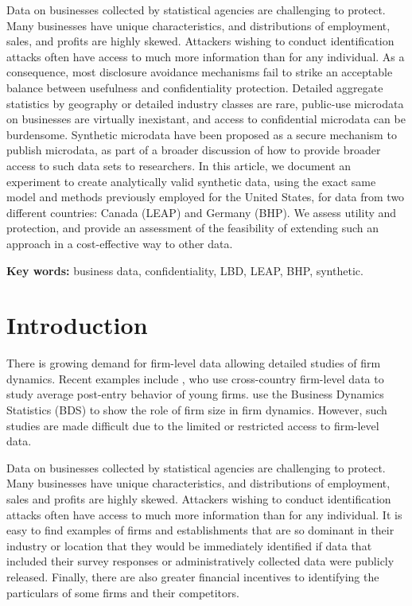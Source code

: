 \documentclass[10pt,twoside]{article}
\begin{document}
\begin{addmargin}[6mm]{6mm}
\begin{small}
\begin{singlespace}

Data on businesses collected by statistical agencies are challenging to protect. Many businesses have unique characteristics, and distributions of employment, sales, and profits are highly skewed. Attackers wishing to conduct identification attacks often have access to much more information than for any individual. As a consequence, most disclosure avoidance mechanisms  fail to strike an acceptable balance between usefulness and confidentiality protection. Detailed aggregate statistics by geography or detailed industry classes are rare, public-use microdata on businesses are virtually inexistant, and access to confidential microdata can be burdensome. 
Synthetic microdata have been proposed as a secure mechanism to publish microdata, as part of a broader discussion of how  to provide broader access to such data sets to researchers.
In this article, we document an experiment to create analytically valid synthetic data, using the exact same model and methods previously employed for the United States, for data from two different countries: Canada (\ac{LEAP}) and Germany (\ac{BHP}). We assess utility and protection, and provide an assessment of the feasibility of extending such an approach in a cost-effective way to other data.

\smallskip \noindent \textbf{Key words:} business data, confidentiality, LBD, LEAP, BHP, synthetic.

\end{singlespace}
\end{small}
\end{addmargin}

\smallskip
\acresetall
\section{Introduction}
There is growing demand for firm-level data allowing detailed studies of firm dynamics. Recent examples include \textcite{NBERc0480}, who use cross-country firm-level data to study average post-entry behavior of young firms. \textcite{10.1257/aer.20141280} use the Business Dynamics Statistics (BDS) to show the role of firm size in firm dynamics. However, such studies are made difficult due to the limited or restricted access to firm-level data.

Data on businesses collected by statistical agencies are challenging to protect. Many businesses have unique characteristics, and distributions of employment, sales and profits are highly skewed. Attackers wishing to conduct identification attacks often have access to much more information than for any individual. It is easy to find examples of firms and establishments that are so dominant in their industry or location that they would be immediately identified if data that included their survey responses or administratively collected data were publicly released.  Finally, there are also greater financial incentives to identifying the particulars of some firms and their competitors.
\end{document}
